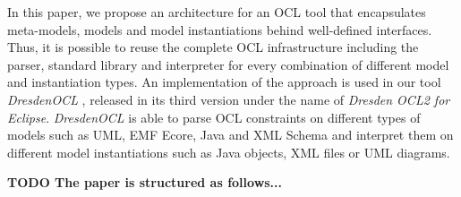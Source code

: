 In this paper, we propose an architecture for an OCL tool that encapsulates meta-models, models and model instantiations behind well-defined interfaces. Thus, it is possible to reuse the complete OCL infrastructure including the parser, standard library and interpreter for every combination of different model and instantiation types. An implementation of the approach is used in our tool \textit{DresdenOCL} \cite{WWW:dresdenOCL}, released in its third version under the name of \textit{Dresden OCL2 for Eclipse}. \textit{DresdenOCL} is able to parse OCL constraints on different types of models such as UML, EMF Ecore, Java and XML Schema and interpret them on different model instantiations such as Java objects, XML files or UML diagrams.

\textbf{TODO The paper is structured as follows...}